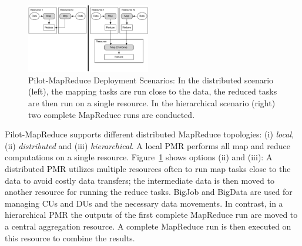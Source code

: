 \documentclass{acm_proc_article-sp}
\newcommand{\jhanote}[1]{ {\textcolor{red} { ***SJ: #1 }}}
\newcommand{\alnote}[1]{ {\textcolor{blue} { ***andreL: #1 }}}
\newcommand{\alnote}[1]{}
\newcommand{\jhanote}[1]{}
\newcommand{\pilotmapreduce}{Pilot-MapReduce\xspace}
\begin{document}
\begin{figure}
	\centering
	\includegraphics[width=0.48\textwidth]{figures/distributed_hierachical.pdf}
	\caption{\pilotmapreduce Deployment Scenarios: In the
          distributed scenario (left), the mapping tasks are run close
          to the data, the reduced tasks are then run on a single
          resource. In the hierarchical scenario (right) two complete
          MapReduce runs are
          conducted. \label{fid:distributed-mapreduce-overview}}
\end{figure}


\pilotmapreduce supports different distributed MapReduce topologies:
(i) \emph{local}, (ii) \emph{distributed} and (iii)
\emph{hierarchical}. A local PMR performs all map and reduce
computations on a single resource.
Figure~\ref{fid:distributed-mapreduce-overview} shows options (ii) and
(iii): A distributed PMR utilizes multiple resources often to run map
tasks close to the data to avoid costly data transfers; the
intermediate data is then moved to another resource for running the
reduce tasks. BigJob and BigData are used for managing CUs and DUs and
the necessary data movements. In contrast, in a hierarchical PMR the
outputs of the first complete MapReduce run are moved to a central
aggregation resource. A complete MapReduce run is then executed on
this resource to combine the results. %
\end{document}
